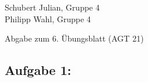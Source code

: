 \documentclass[a4paper]{article}
\begin{document}
\begin{small}
    \noindent
    Schubert Julian, Gruppe 4 \\
    Philipp Wahl, Gruppe 4
\end{small}
\bigskip

\begin{center}
    \LARGE Abgabe zum 6. Übungsblatt (AGT 21)
\end{center}
\smallskip
\subsection*{Aufgabe 1:}
\end{document}
